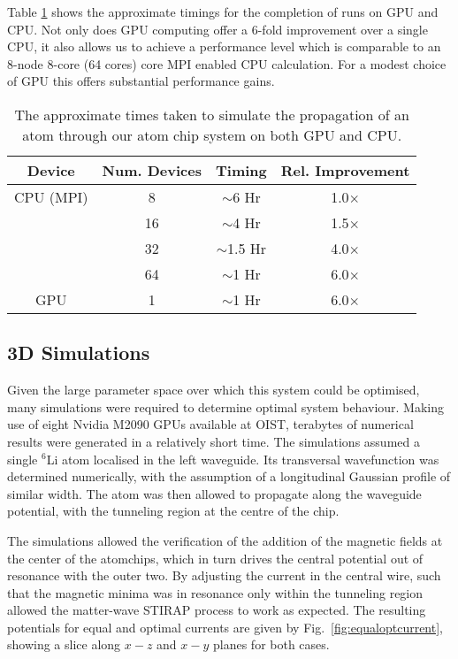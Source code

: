 Table \ref{tbl:timing} shows the approximate timings for the completion of runs on GPU and CPU. Not only does GPU computing offer a 6-fold improvement over a single CPU, it also allows us to achieve a performance level which is comparable to an 8-node 8-core (64 cores) core MPI enabled CPU calculation. For a modest choice of GPU this offers substantial performance gains.

\begin{table}[tb]
  \begin{center}
    \begin{tabular}{|c||c|c|c|}
      \hline
      Device & Num. Devices & Timing  & Rel. Improvement \\ \hline
      CPU (MPI) & 8 & $\sim$6 Hr & 1.0$\times$ \\
      & 16 & $\sim$4 Hr & 1.5$\times$ \\
      & 32 & $\sim$1.5 Hr & 4.0$\times$ \\
      & 64 & $\sim$1 Hr & 6.0$\times$ \\ \hline
      GPU & 1 & $\sim$1 Hr & 6.0$\times$ \\ \hline
    \end{tabular}
  \end{center}
   \caption{The approximate times taken to simulate the propagation of an atom through our atom chip system on both GPU and CPU.}
   \label{tbl:timing}
\end{table}



\subsection{3D Simulations}
\label{sec:Results}

Given the large parameter space over which this system could be optimised, many simulations were required to determine optimal system behaviour. Making use of eight Nvidia M2090 GPUs available at OIST, terabytes of numerical results were generated in a relatively short time. The simulations assumed a single $^{6}$Li atom localised in the left waveguide. Its transversal wavefunction was determined numerically, with the assumption of a longitudinal Gaussian profile of similar width. The atom was then allowed to propagate along the waveguide potential, with the tunneling region at the centre of the chip.

The simulations allowed the verification of the addition of the magnetic fields at the center of the atomchips, which in turn drives the central potential out of resonance with the outer two. By adjusting the current in the central wire, such that the magnetic minima was in resonance only within the tunneling region allowed the matter-wave STIRAP process to work as expected. The resulting potentials for equal and optimal currents are given by Fig.~\ref{fig:equaloptcurrent}, showing a slice along $x-z$ and $x-y$ planes for both cases.


